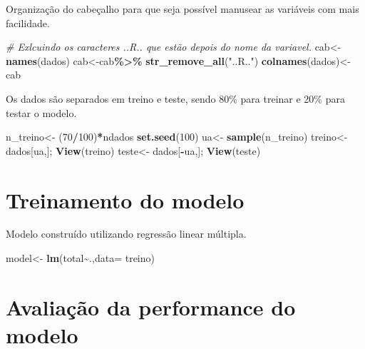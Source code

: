 \documentclass[
]{article}
\newenvironment{Shaded}{\begin{snugshade}}{\end{snugshade}}
\newcommand{\CommentTok}[1]{\textcolor[rgb]{0.56,0.35,0.01}{\textit{#1}}}
\newcommand{\DataTypeTok}[1]{\textcolor[rgb]{0.13,0.29,0.53}{#1}}
\newcommand{\DecValTok}[1]{\textcolor[rgb]{0.00,0.00,0.81}{#1}}
\newcommand{\KeywordTok}[1]{\textcolor[rgb]{0.13,0.29,0.53}{\textbf{#1}}}
\newcommand{\NormalTok}[1]{#1}
\newcommand{\OperatorTok}[1]{\textcolor[rgb]{0.81,0.36,0.00}{\textbf{#1}}}
\newcommand{\StringTok}[1]{\textcolor[rgb]{0.31,0.60,0.02}{#1}}
\begin{document}
\n Organização do cabeçalho para que seja possível manusear as variáveis
com mais facilidade.

\begin{Shaded}
\begin{Highlighting}[]
\CommentTok{\# Exlcuindo os caracteres ..R.. que estão depois do nome da variavel.}
\NormalTok{cab\textless{}{-}}\KeywordTok{names}\NormalTok{(dados)}
\NormalTok{cab\textless{}{-}cab}\OperatorTok{\%\textgreater{}\%}\StringTok{ }\KeywordTok{str\_remove\_all}\NormalTok{(}\StringTok{"..R.."}\NormalTok{)}
\KeywordTok{colnames}\NormalTok{(dados)\textless{}{-}}\StringTok{ }\NormalTok{cab}
\end{Highlighting}
\end{Shaded}

Os dados são separados em treino e teste, sendo 80\% para treinar e 20\%
para testar o modelo.

\begin{Shaded}
\begin{Highlighting}[]
\NormalTok{n\_treino\textless{}{-}}\StringTok{ }\NormalTok{(}\DecValTok{70}\OperatorTok{/}\DecValTok{100}\NormalTok{)}\OperatorTok{*}\NormalTok{ndados}
\KeywordTok{set.seed}\NormalTok{(}\DecValTok{100}\NormalTok{)}
\NormalTok{ua\textless{}{-}}\StringTok{ }\KeywordTok{sample}\NormalTok{(n\_treino)}
\NormalTok{treino\textless{}{-}}\StringTok{ }\NormalTok{dados[ua,]; }\KeywordTok{View}\NormalTok{(treino)}
\NormalTok{teste\textless{}{-}}\StringTok{ }\NormalTok{dados[}\OperatorTok{{-}}\NormalTok{ua,]; }\KeywordTok{View}\NormalTok{(teste)}
\end{Highlighting}
\end{Shaded}

\hypertarget{treinamento-do-modelo}{%
\section{Treinamento do modelo}\label{treinamento-do-modelo}}

Modelo construído utilizando regressão linear múltipla.

\begin{Shaded}
\begin{Highlighting}[]
\NormalTok{model\textless{}{-}}\StringTok{ }\KeywordTok{lm}\NormalTok{(total}\OperatorTok{\textasciitilde{}}\NormalTok{.,}\DataTypeTok{data=}\NormalTok{ treino)}
\end{Highlighting}
\end{Shaded}

\hypertarget{avaliauxe7uxe3o-da-performance-do-modelo}{%
\section{Avaliação da performance do
modelo}\label{avaliauxe7uxe3o-da-performance-do-modelo}}
\end{document}
